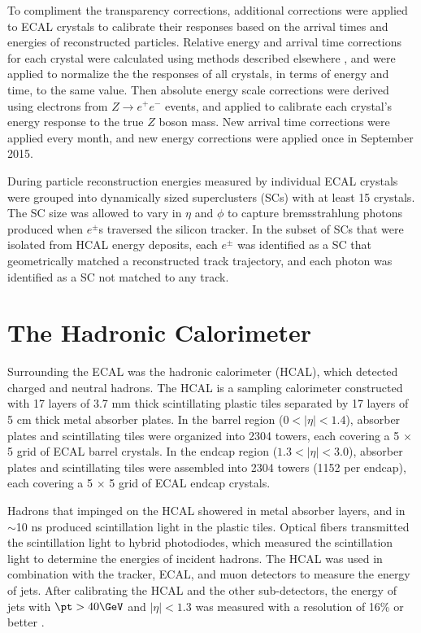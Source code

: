 To compliment the transparency corrections, additional corrections were applied to ECAL crystals 
to calibrate their responses based on the arrival times and energies of reconstructed particles.  Relative energy 
and arrival time corrections for each crystal were calculated using methods described elsewhere \cite{eGammaMonitCalib2011}, and 
were applied to normalize the the responses of all crystals, in terms of energy and time, to the same value.  Then 
absolute energy scale corrections were derived using electrons from $Z \rightarrow e^{+}e^{-}$ events, and applied 
to calibrate each crystal's energy response to the true $Z$ boson mass.  New arrival time corrections were applied 
every month, and new energy corrections were applied once in September 2015.

During particle reconstruction energies measured by individual ECAL crystals were grouped into dynamically 
sized superclusters (SCs) with at least 15 crystals.  The SC size was allowed to vary in $\eta$ and $\phi$ to capture 
bremsstrahlung photons produced when $e^{\pm}$s traversed the silicon tracker.  In the subset of SCs that were isolated 
from HCAL energy deposits, each $e^{\pm}$ was identified as a SC that geometrically matched a reconstructed track 
trajectory, and each photon was identified as a SC not matched to any track.


\section{The Hadronic Calorimeter}
\label{sec:hcalDescription}
Surrounding the ECAL was the hadronic calorimeter (HCAL), which detected charged and neutral hadrons.  The 
HCAL is a sampling calorimeter constructed with 17 layers of 3.7 mm thick scintillating plastic tiles separated by 
17 layers of 5 cm thick metal absorber plates.  In the barrel 
region ($0 < |\eta| < 1.4$), absorber plates and scintillating tiles were organized into 2304 towers, each 
covering a 5 $\times$ 5 grid of ECAL barrel crystals.  In the endcap region ($1.3 < |\eta| < 3.0$), absorber 
plates and scintillating tiles were assembled into 2304 towers (1152 per endcap), each covering 
a 5 $\times$ 5 grid of ECAL endcap crystals.

Hadrons that impinged on the HCAL showered in metal absorber layers, and in $\sim$10 ns produced scintillation 
light in the plastic tiles.  Optical fibers transmitted the scintillation light to hybrid photodiodes, 
which measured the scintillation light to determine the energies of incident hadrons.  The HCAL was used in 
combination with the tracker, ECAL, and muon detectors to measure the energy of jets.  After calibrating the 
HCAL and the other sub-detectors, the energy of jets with $\pt > 40\GeV$ and $|\eta| < 1.3$ was measured with 
a resolution of 16\% or better \cite{jetResolutionInCollisions}.

